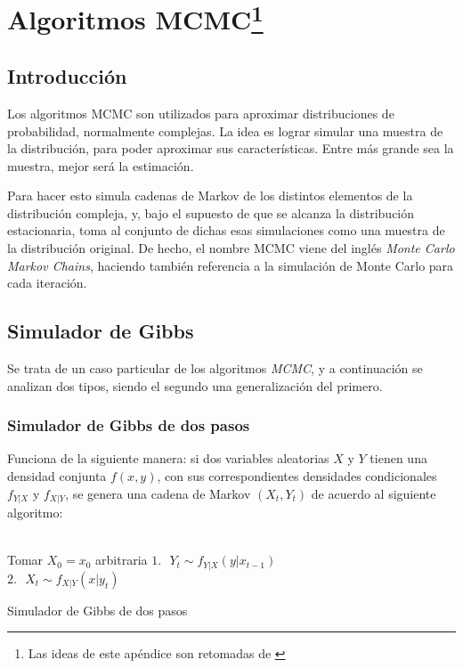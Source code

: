 \chapter[Algoritmos MCMC]{Algoritmos MCMC\footnote{Las ideas de este ap\'endice son retomadas de \cite{Robert_MCMC}} }\label{chap:MCMC}

\section {Introducci\'on}

Los algoritmos MCMC son utilizados para aproximar distribuciones de probabilidad, normalmente complejas. La idea es lograr simular una muestra de la distribuci\'on, para poder aproximar sus caracter\'isticas. Entre m\'as grande sea la muestra, mejor ser\'a la estimaci\'on.

Para hacer esto simula cadenas de Markov de los distintos elementos de la distribuci\'on compleja, y, bajo el supuesto de que se alcanza la distribuci\'on estacionaria, toma al conjunto de dichas esas simulaciones como una muestra de la distribuci\'on original. De hecho, el nombre MCMC viene del ingl\'es \textit{Monte Carlo Markov Chains}, haciendo tambi\'en referencia a la simulaci\'on de Monte Carlo para cada iteraci\'on.

\section{Simulador de Gibbs}

Se trata de un caso particular de los algoritmos \textit{MCMC}, y a continuaci\'on se analizan dos tipos, siendo el segundo una generalizaci\'on del primero.

\subsection{Simulador de Gibbs de dos pasos}

Funciona de la siguiente manera: si dos variables aleatorias $X$ y $Y$ tienen una densidad conjunta $f(x,y)$, con sus correspondientes densidades condicionales $f_{Y|X}$ y $f_{X|Y}$, se genera una cadena de Markov $(X_t,Y_t)$ de acuerdo al siguiente algoritmo:
\\ \\
\begin{algorithm}[H]
 {Tomar $X_0 = x_0$ arbitraria \;
     {
        $1. \text{ } Y_t \sim f_{Y|X}(y|x_{t-1})\;$\\
        $2. \text{ } X_t \sim f_{X|Y}(x|y_{t})\;$
     }
 }
 \caption{Simulador de Gibbs de dos pasos}
\end{algorithm}
\BlankLine

